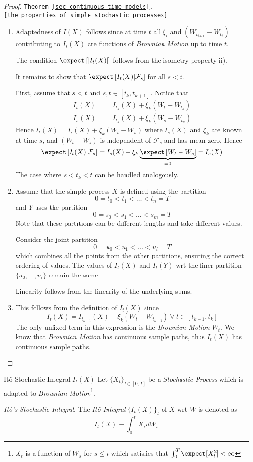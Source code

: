 \documentclass[11pt,a4paper]{article}
\begin{document}
\begin{proof}{\texttt{Theorem \ref{sec_continuous_time_models}.\ref{the_properties_of_simple_stochastic_processes}}}
\begin{enumerate}
      \item Adaptedness of $I(X)$ follows since at time $t$ all $\xi_i$ and $(W_{t_{i+1}}-W_{t_i})$ contributing to $I_t(X)$ are functions of \textit{Brownian Motion} up to time $t$.
      \par The condition $\expect\left[\left|I_t(X)\right|\right]$ follows from the isometry property ii).
      \par It remains to show that $\expect\left[I_t(X)|\mathcal{F}_s\right]$ for all $s<t$.
      \par First, assume that $s<t$ and $s,t\in[t_k,t_{k+1}]$. Notice that
      \[\begin{array}{rcl}
        I_t(X)&=&I_{t_k}(X)+\xi_k(W_t-W_{t_k})\\
        I_s(X)&=&I_{t_k}(X)+\xi_k(W_s-W_{t_k})
      \end{array}\]
      Hence $I_t(X)=I_s(X)+\xi_k(W_t-W_s)$ where $I_s(X)$ and $\xi_k$ are known at time $s$, and $(W_t-W_s)$ is independent of $\mathcal{F}_s$ and has mean zero. Hence
      \[ \expect\left[I_t(X)|\mathcal{F}_s\right]=I_s(X)+\xi_k\underbrace{\expect\left[W_t-W_s\right]}_{=0}=I_s(X) \]
      The case where $s<t_k<t$ can be handled analogously.

      \item Assume that the simple process $X$ is defined using the partition
      \[ 0=t_0<t_1<\dots<t_n=T \]
      and $Y$ uses the partition
      \[ 0=s_0<s_1<\dots<s_m=T \]
      Note that these partitions can be different lengths and take different values.
      \par Consider the joint-partition
      \[ 0=u_0<u_1<\dots<u_l=T \]
      which combines all the points from the other partitions, ensuring the correct ordering of values. The values of $I_t(X)$ and $I_t(Y)$ wrt the finer partition $\{u_0,\dots,u_l\}$ remain the same.
      \par Linearity follows from the linearity of the underlying sums.

      \item This follows from the definition of $I_t(X)$ since
      \[ I_t(X)=I_{t_{k-1}}(X)+\xi_k(W_t-W_{t_{k-1}})\ \forall\ t\in[t_{k-1},t_k] \]
      The only unfixed term in this expression is the \textit{Brownian Motion} $W_t$. We know that \textit{Brownian Motion} has continuous sample paths, thus $I_t(X)$ has continuous sample paths.
    \end{enumerate}
  \end{proof}

  \begin{definition}{It\^o Stochastic Integral $I_t(X)$}
    Let $\{X_t\}_{t\in[0,T]}$ be a \textit{Stochastic Process} which is adapted to \textit{Brownian Motion}\footnote{$X_t$ is a function of $W_s$ for $s\leq t$ which satisfies that $\int_0^T\expect[X_t^2]<\infty$}.
    \par \textit{It\^o's Stochastic Integral}. The \textit{It\^o Integral} $\{I_t(X)\}_t$ of $X$ wrt $W$ is denoted as
    \[ I_t(X)=\int_0^tX_sdW_s \]
  \end{definition}
\end{document}
